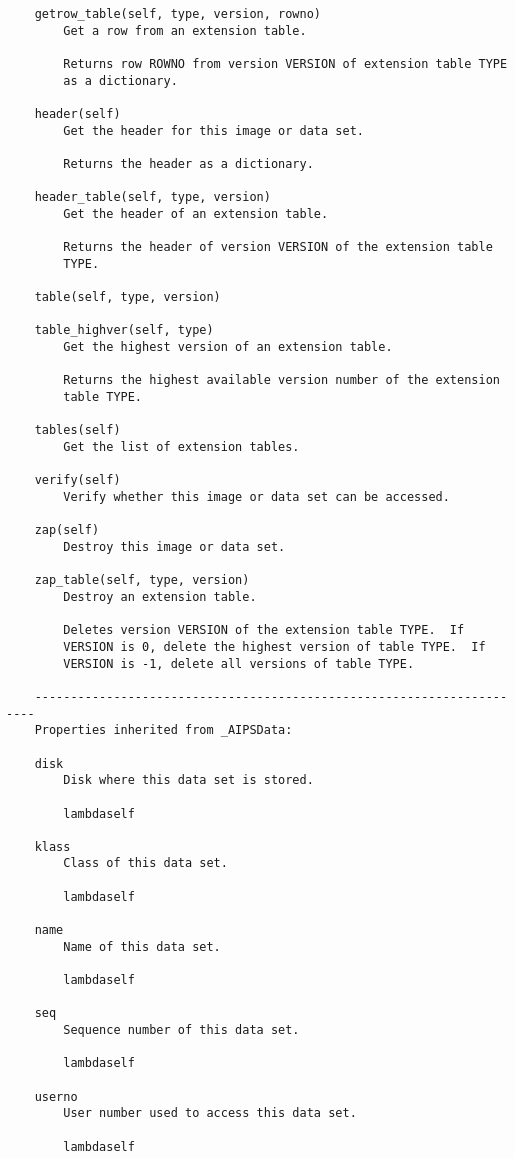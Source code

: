 \documentclass[11pt]{report}
\begin{document}
\begin{verbatim}
    getrow_table(self, type, version, rowno)
        Get a row from an extension table.
        
        Returns row ROWNO from version VERSION of extension table TYPE
        as a dictionary.
    
    header(self)
        Get the header for this image or data set.
        
        Returns the header as a dictionary.
    
    header_table(self, type, version)
        Get the header of an extension table.
        
        Returns the header of version VERSION of the extension table
        TYPE.
    
    table(self, type, version)
    
    table_highver(self, type)
        Get the highest version of an extension table.
        
        Returns the highest available version number of the extension
        table TYPE.
    
    tables(self)
        Get the list of extension tables.
    
    verify(self)
        Verify whether this image or data set can be accessed.
    
    zap(self)
        Destroy this image or data set.
    
    zap_table(self, type, version)
        Destroy an extension table.
        
        Deletes version VERSION of the extension table TYPE.  If
        VERSION is 0, delete the highest version of table TYPE.  If
        VERSION is -1, delete all versions of table TYPE.
    
    ----------------------------------------------------------------------
    Properties inherited from _AIPSData:
    
    disk
        Disk where this data set is stored.
    
        lambdaself
    
    klass
        Class of this data set.
    
        lambdaself
    
    name
        Name of this data set.
    
        lambdaself
    
    seq
        Sequence number of this data set.
    
        lambdaself
    
    userno
        User number used to access this data set.
    
        lambdaself

\end{verbatim}
\end{document}
